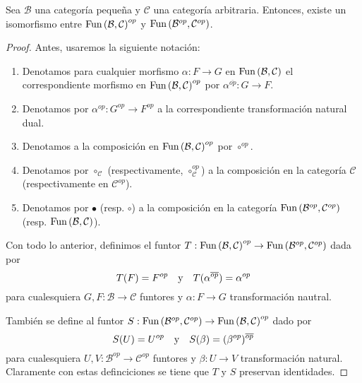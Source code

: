 \documentclass[12pt]{report}
\newcounter{it}
\theoremstyle{largebreak}
\newcommand\cf[3]{\ensuremath{#1:#2\rightarrow#3}}
\newcommand{\Fun}[2]{\ensuremath{\textup{Fun}\left(#1,#2\right)}}
\begin{document}
    \begin{propo}
        Sea $\mathcal{B}$ una categoría pequeña y $\mathcal{C}$ una categoría arbitraria. Entonces, existe un isomorfismo entre $\Fun{\mathcal{B}}{\mathcal{C}}^{op}$ y $\Fun{\mathcal{B}^{op}}{\mathcal{C}^{op}}$.
    \end{propo}

    \begin{proof}
        Antes, usaremos la siguiente notación:
        \begin{enumerate}
            \item Denotamos para cualquier morfismo $\cf{\alpha}{F}{G}$ en $\Fun{\mathcal{B}}{\mathcal{C}}$ el correspondiente morfismo en $\Fun{\mathcal{B}}{\mathcal{C}}^{op}$ por $\cf{\alpha^{\overline{op}}}{G}{F}$.
            \item Denotamos por $\cf{\alpha^{op}}{G^{op}}{F^{op}}$ a la correspondiente transformación natural dual.
            \item Denotamos a la composición en $\Fun{\mathcal{B}}{\mathcal{C}}^{op}$ por $\circ^{op}$.
            \item Denotamos por $\circ_{\mathcal{C}}$ (respectivamente, $\circ_{\mathcal{C}}^{op}$) a la composición en la categoría $\mathcal{C}$ (respectivamente en $\mathcal{C}^{op}$).
            \item Denotamos por $\bullet$ (resp. $\circ$) a la composición en la categoría $\Fun{\mathcal{B}^{op}}{\mathcal{C}^{op}}$ (resp. $\Fun{\mathcal{B}}{\mathcal{C}}$).
        \end{enumerate}

        Con todo lo anterior, definimos el funtor $\cf{T}{\Fun{\mathcal{B}}{\mathcal{C}}^{op}}{\Fun{\mathcal{B}^{op}}{\mathcal{C}^{op}}}$ dada por
        \begin{equation*}
            T(F)=F^{op}\quad\textup{y}\quad T(\alpha^{\overline{op}})=\alpha^{op}
        \end{equation*}
        para cualesquiera $\cf{G,F}{\mathcal{B}}{\mathcal{C}}$ funtores y $\cf{\alpha}{F}{G}$ transformación nautral.

        También se define al funtor $\cf{S}{\Fun{\mathcal{B}^{op}}{\mathcal{C}^{op}}}{\Fun{\mathcal{B}}{\mathcal{C}}^{op}}$ dado por
        \begin{equation*}
            S(U)=U^{op}\quad\textup{y}\quad S(\beta)=(\beta^{op})^{\overline{op}}
        \end{equation*}
        para cualesquiera $\cf{U,V}{\mathcal{B}^{op}}{\mathcal{C}^{op}}$ funtores y $\cf{\beta}{U}{V}$ transformación natural. Claramente con estas definciciones se tiene que $T$ y $S$ preservan identidades.


\end{proof}
\end{document}
